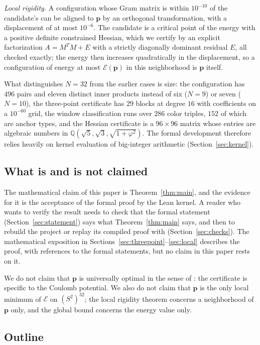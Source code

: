 \documentclass[11pt]{amsart}
\theoremstyle{definition}
\theoremstyle{remark}
\newcommand{\Q}{\mathbb{Q}}
\newcommand{\Sph}{S^{2}}
\newcommand{\E}{\mathcal{E}}
\newcommand{\cand}{\mathbf{p}}
\begin{document}
\emph{Local rigidity.} A configuration whose Gram matrix is within $10^{-10}$ of the candidate's can be aligned to $\cand$ by an orthogonal transformation, with a displacement of at most $10^{-6}$. The candidate is a critical point of the energy with a positive definite constrained Hessian, which we certify by an explicit factorization $A=M^{T}M+E$ with a strictly diagonally dominant residual $E$, all checked exactly; the energy then increases quadratically in the displacement, so a configuration of energy at most $\E(\cand)$ in this neighborhood is $\cand$ itself.

What distinguishes $N=32$ from the earlier cases is size: the configuration has $496$ pairs and eleven distinct inner products instead of six ($N=9$) or seven ($N=10$), the three-point certificate has $29$ blocks at degree $16$ with coefficients on a $10^{-60}$ grid, the window classification runs over $286$ color triples, $152$ of which are anchor types, and the Hessian certificate is a $96\times 96$ matrix whose entries are algebraic numbers in $\Q(\sqrt5,\sqrt3,\sqrt{1+\varphi^{2}})$. The formal development therefore relies heavily on kernel evaluation of big-integer arithmetic (Section~\ref{sec:kernel}).

\subsection{What is and is not claimed}

The mathematical claim of this paper is Theorem~\ref{thm:main}, and the evidence for it is the acceptance of the formal proof by the Lean kernel. A reader who wants to verify the result needs to check that the formal statement (Section~\ref{sec:statement}) says what Theorem~\ref{thm:main} says, and then to rebuild the project or replay its compiled proof with  (Section~\ref{sec:checks}). The mathematical exposition in Sections~\ref{sec:threepoint}--\ref{sec:local} describes the proof, with references to the formal statements, but no claim in this paper rests on it.

We do not claim that $\cand$ is universally optimal in the sense of \cite{CohnKumar2007}: the certificate is specific to the Coulomb potential. We also do not claim that $\cand$ is the only local minimum of $\E$ on $(\Sph)^{32}$; the local rigidity theorem concerns a neighborhood of $\cand$ only, and the global bound concerns the energy value only.

\subsection{Outline}
\end{document}
